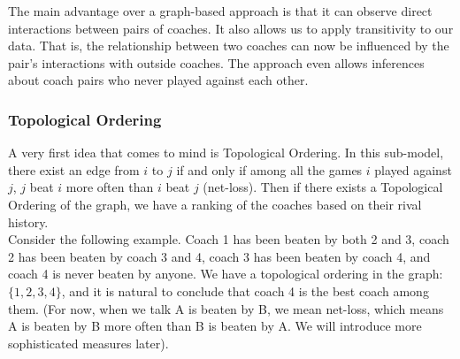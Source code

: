 \documentclass[titlepage]{article}
\begin{document}
The main advantage over a graph-based approach is that it can observe direct interactions between pairs of coaches. It also allows us to apply transitivity to our data. That is, the relationship between two coaches can now be influenced by the pair's interactions with outside coaches. The approach even allows inferences about coach pairs who never played against each other. 

\subsubsection{Topological Ordering}
A very first idea that comes to mind is Topological Ordering. In this sub-model, there exist an edge from $i$ to $j$ if and only if among all the games $i$ played against $j$, $j$ beat $i$ more often than $i$ beat $j$ (net-loss). Then if there exists a Topological Ordering of the graph, we have a ranking of the coaches based on their rival history.
\\

\noindent Consider the following example. Coach 1 has been beaten by both 2 and 3, coach 2 has been beaten by coach 3 and 4, coach 3 has been beaten by coach 4, and coach 4 is never beaten by anyone. We have a topological ordering in the graph: $\{1, 2, 3, 4\}$, and it is natural to conclude that coach 4 is the best coach among them. (For now, when we talk A is beaten by B, we mean net-loss, which means A is beaten by B more often than B is beaten by A. We will introduce more sophisticated measures later).

\begin{center}
\end{center}
\end{document}
